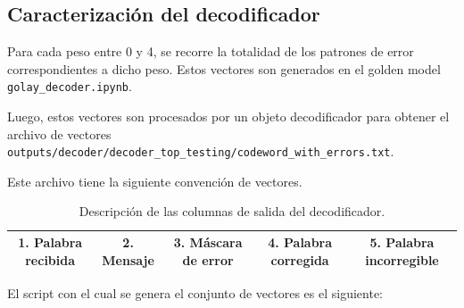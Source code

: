 \subsection{Caracterización del decodificador}

Para cada peso entre 0 y 4, se recorre la totalidad de los patrones
de error correspondientes a dicho peso. Estos vectores son generados
en el golden model \texttt{golay\_decoder.ipynb}.

Luego, estos vectores son procesados por un objeto decodificador para
obtener el archivo de vectores
\texttt{outputs/decoder/decoder\_top\_testing/codeword\_with\_errors.txt}.

Este archivo tiene la siguiente convención de vectores.

\begin{table}[h!]
    \centering
    \begin{tabular}{|c|c|c|c|c|}
        \hline
        1. Palabra recibida &
        2. Mensaje &
        3. Máscara de error &
        4. Palabra corregida &
        5. Palabra incorregible \\
        \hline
    \end{tabular}
    \caption{Descripción de las columnas de salida del decodificador.}
    \label{tab:decoder_output}
\end{table}

El script con el cual se genera el conjunto de vectores es el siguiente:


